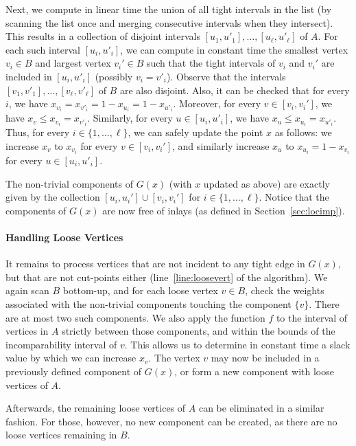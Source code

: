 \documentclass{article} \usepackage{fullpage}
\begin{document}
Next, we compute in linear time the union of all tight intervals in the list (by scanning the list once and merging consecutive intervals when they intersect). This results in a collection of disjoint intervals $[u_{1},u'_{1}], \dots, [u_{\ell},u'_{\ell}]$ of $A$. For each such interval $[u_{i},u'_{i}]$, we can compute in constant time the smallest vertex $v_{i} \in B$ and largest vertex $v_{i}' \in B$ such that the tight intervals of $v_{i}$ and $v_{i}'$ are included in $[u_i,u'_i]$ (possibly $v_{i} = v'_{i}$). Observe that the intervals $[v_{1},v'_{1}], \dots, [v_{\ell},v'_{\ell}]$ of $B$ are also disjoint. Also, it can be checked that for every $i$, we have $x_{v_{i}} = x_{v'_{i}} = 1 - x_{u_{i}} = 1 - x_{u'_{i}}$. Moreover, for every $v \in [v_{i}, v_{i}']$, we have $x_{v} \leq x_{v_{i}} = x_{v'_{i}}$. Similarly, for every $u \in [u_i,u'_i]$, we have  $x_{u} \leq x_{u_{i}} = x_{u'_{i}}$. Thus, for every $i \in \{1, \dots, \ell\}$, we can safely update the point $x$ as follows: we increase $x_{v}$ to $x_{v_{i}}$ for every $v \in [v_{i}, v_{i}']$, and similarly
increase $x_{u}$ to $x_{u_{i}} = 1 - x_{v_{i}}$ for every $u \in [u_{i},u'_{i}]$. 

The non-trivial components of $G(x)$ (with $x$ updated as above) are exactly given by the collection $[u_{i},u_{i}'] \cup [v_{i}, v_{i}']$ for $i \in \{1, \dots, \ell\}$. Notice that the components of $G(x)$ are now free of inlays (as defined in Section~\ref{sec:locimp}).

\paragraph*{Handling Loose Vertices}

It remains to process vertices that are not incident to any tight edge in $G(x)$, but that are not cut-points either (line~\ref{line:loosevert} of the algorithm). We again scan $B$ bottom-up, and for each loose vertex $v\in B$, check the weights associated with the non-trivial components touching the component $\{v\}$. There are at most two such components. We also apply the function $f$ to the interval of vertices in $A$ strictly between those components, and within the bounds of the incomparability interval of $v$. This allows us to determine in constant time a slack value by which we can increase $x_{v}$. The vertex $v$ may now be included in a previously defined component of $G(x)$, or form a new component with loose vertices of $A$.

Afterwards, the remaining loose vertices of $A$ can be eliminated in a similar fashion. For those, however, no new component can be created, as there are no loose vertices remaining in $B$.
\end{document}
